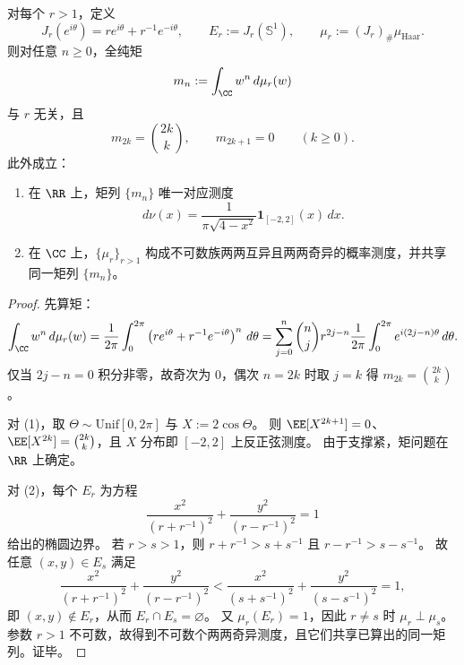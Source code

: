 \begin{theorem}[同一全纯矩列的实线确定性与复平面非确定性]\label{thm:xi-joukowsky-holomorphic-moments-real-determinate-complex-indeterminate}
对每个 \(r>1\)，定义
\[
J_r(e^{i\theta})=r e^{i\theta}+r^{-1}e^{-i\theta},\qquad
E_r:=J_r(\mathbb S^1),\qquad
\mu_r:=(J_r)_{\#}\mu_{\mathrm{Haar}}.
\]
则对任意 \(n\ge 0\)，全纯矩
\[
m_n:=\int_{\CC} w^n\,d\mu_r(w)
\]
与 \(r\) 无关，且
\[
m_{2k}=\binom{2k}{k},\qquad m_{2k+1}=0\qquad(k\ge 0).
\]
此外成立：
\begin{enumerate}
  \item 在 \(\RR\) 上，矩列 \(\{m_n\}\) 唯一对应测度
  \[
  d\nu(x)=\frac{1}{\pi\sqrt{4-x^2}}\mathbf 1_{[-2,2]}(x)\,dx.
  \]
  \item 在 \(\CC\) 上，\(\{\mu_r\}_{r>1}\) 构成不可数族两两互异且两两奇异的概率测度，并共享同一矩列 \(\{m_n\}\)。
\end{enumerate}
\end{theorem}
\begin{proof}
先算矩：
\[
\int_{\CC}w^n\,d\mu_r(w)
=\frac{1}{2\pi}\int_{0}^{2\pi}\left(r e^{i\theta}+r^{-1}e^{-i\theta}\right)^n\,d\theta
=\sum_{j=0}^{n}\binom{n}{j}r^{2j-n}\frac{1}{2\pi}\int_{0}^{2\pi}e^{i(2j-n)\theta}\,d\theta.
\]
仅当 \(2j-n=0\) 积分非零，故奇次为 \(0\)，偶次 \(n=2k\) 时取 \(j=k\) 得 \(m_{2k}=\binom{2k}{k}\)。
\par
对 (1)，取 \(\Theta\sim\mathrm{Unif}[0,2\pi]\) 与 \(X:=2\cos\Theta\)。
则 \(\EE[X^{2k+1}]=0\)、\(\EE[X^{2k}]=\binom{2k}{k}\)，且 \(X\) 分布即 \([-2,2]\) 上反正弦测度。
由于支撑紧，矩问题在 \(\RR\) 上确定。
\par
对 (2)，每个 \(E_r\) 为方程
\[
\frac{x^2}{(r+r^{-1})^2}+\frac{y^2}{(r-r^{-1})^2}=1
\]
给出的椭圆边界。
若 \(r>s>1\)，则 \(r+r^{-1}>s+s^{-1}\) 且 \(r-r^{-1}>s-s^{-1}\)。
故任意 \((x,y)\in E_s\) 满足
\[
\frac{x^2}{(r+r^{-1})^2}+\frac{y^2}{(r-r^{-1})^2}
<
\frac{x^2}{(s+s^{-1})^2}+\frac{y^2}{(s-s^{-1})^2}
=1,
\]
即 \((x,y)\notin E_r\)，从而 \(E_r\cap E_s=\varnothing\)。
又 \(\mu_r(E_r)=1\)，因此 \(r\neq s\) 时 \(\mu_r\perp\mu_s\)。
参数 \(r>1\) 不可数，故得到不可数个两两奇异测度，且它们共享已算出的同一矩列。证毕。
\end{proof}

